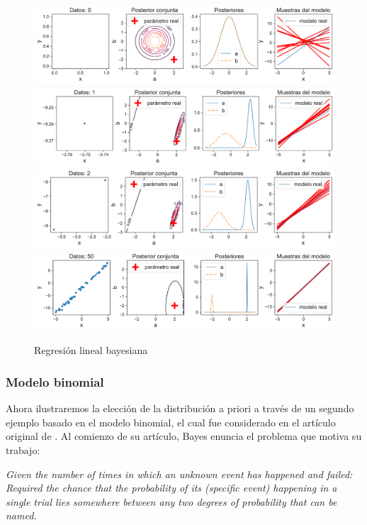 \begin{mdframed}[style=ejemplo, frametitle={\center Ejemplo: Distribución posterior modelo lineal y gaussiano}]
\begin{minipage}[t]{0.65\textwidth}
\begin{figure}[H]
	\includegraphics[width=\textwidth,frame]{img/cap1_bayesian_lin_reg_0.pdf}\\
	\includegraphics[width=\textwidth,frame]{img/cap1_bayesian_lin_reg_1.pdf}\\
	\includegraphics[width=\textwidth,frame]{img/cap1_bayesian_lin_reg_2.pdf}\\
	\includegraphics[width=\textwidth,frame]{img/cap1_bayesian_lin_reg_50.pdf}
	\caption{Regresión lineal bayesiana}
	\label{fig:bayesian_lin_reg}
\end{figure}
\end{minipage}


\end{mdframed}

\subsubsection{Modelo binomial}

Ahora ilustraremos la elección de la distribución a priori a través de un segundo ejemplo basado en el modelo binomial, el cual fue considerado en el artículo original de \cite{bayes}. Al comienzo de su artículo, Bayes enuncia el problema que motiva su trabajo: 
\begin{center}
\it
Given the number of times in which an unknown event has happened and
failed: Required the chance that the probability of its (specific event)
happening in a single trial lies somewhere between any two degrees of
probability that can be named.
\end{center}

